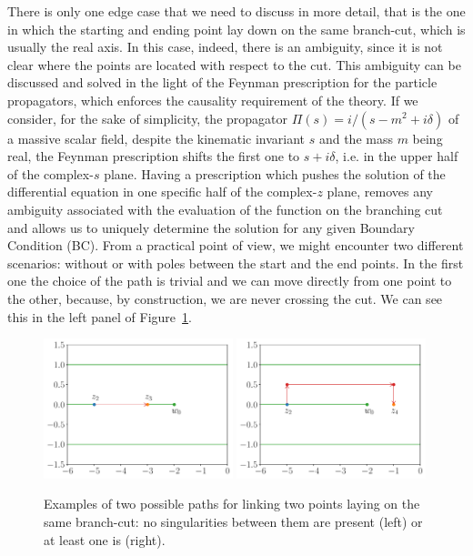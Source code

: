 \documentclass[final,1p,times]{elsarticle}
\begin{document}
There is only one edge case that we need to discuss in more detail, that is the one in which the starting and ending point lay down on the same branch-cut, which is usually the real axis. In this case, indeed, there is an ambiguity, since it is not clear where the points are located with respect to the cut. This ambiguity can be discussed and solved in the light of the Feynman prescription for the particle propagators, which enforces the causality requirement of the theory.
If we consider, for the sake of simplicity, the propagator $\Pi(s)=i/(s-m^2+i\delta)$ of a massive scalar field, despite the kinematic invariant $s$ and the mass $m$ being real, the Feynman prescription shifts the first one to $s+i\delta$, i.e. in the upper half of the complex-$s$ plane.
Having a prescription which pushes the solution of the differential equation in one specific half of the complex-$z$ plane, removes any ambiguity associated with the evaluation of the function on the branching cut and allows us to uniquely determine the solution for any given Boundary Condition (BC).
From a practical point of view, we might encounter two different scenarios: without or with poles between the start and the end points. In the first one the choice of the path is trivial and we can move directly from one point to the other, because, by construction, we are never crossing the cut. We can see this in the left panel of Figure~\ref{fig:realAxis}. 
\begin{figure}[t]
\includegraphics[width=0.49\textwidth]{path_realaxis.pdf}
\includegraphics[width=0.49\textwidth]{path_realaxis2.pdf}
\caption{\label{fig:realAxis}
Examples of two possible paths for linking two points laying on the same branch-cut: no singularities between them are present (left) or at least one is (right).}
\end{figure}
\end{document}

